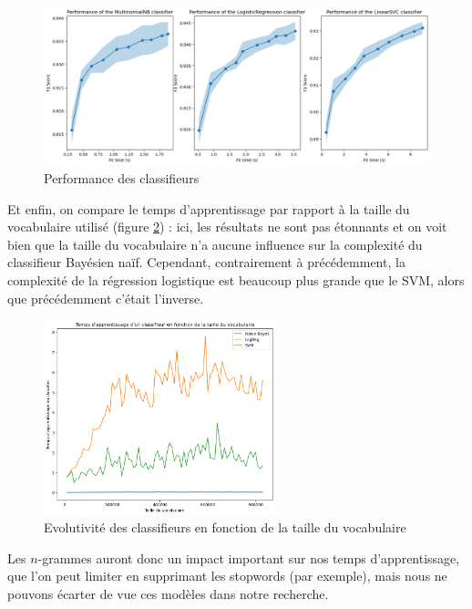 \documentclass{article}
\begin{document}
\begin{figure}[H]
    \centering
    \includegraphics[width=\textwidth]{./src/locuteur/complexity_analysis_accuracy.png} 
    \caption{Performance des classifieurs}
    \label{complexity_analysis_accuracy_pres}
\end{figure}

Et enfin, on compare le temps d'apprentissage par rapport à la taille du vocabulaire utilisé (figure \ref{complexity_analysis_vocabulary}) : ici, les résultats ne sont pas étonnants et on voit bien que la taille du vocabulaire n'a aucune influence sur la complexité du classifieur Bayésien naïf. Cependant, contrairement à précédemment, la complexité de la régression logistique est beaucoup plus grande que le SVM, alors que précédemment c'était l'inverse.

\begin{figure}[H]
    \centering
    \includegraphics[width=0.6\textwidth]{./src/locuteur/complexity_analysis_vocabulary.png} 
    \caption{Evolutivité des classifieurs en fonction de la taille du vocabulaire}
    \label{complexity_analysis_vocabulary}
\end{figure}

Les $n$-grammes auront donc un impact important sur nos temps d'apprentissage, que l'on peut limiter en supprimant les stopwords (par exemple), mais nous ne pouvons écarter de vue ces modèles dans notre recherche.
\end{document}
